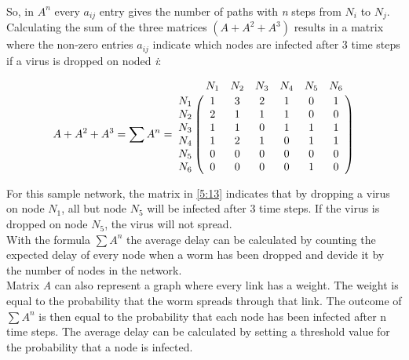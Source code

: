 ~~\\
So, in $A^{n}$ every $a_{ij}$ entry gives the number of paths with \textit{n} steps from $N_{i}$ to $N_{j}$.\\

Calculating the sum of the three matrices $(A + A^{2} + A^{3}) $ results in a matrix where the non-zero entries $a_{ij}$ indicate which nodes are infected after 3 time steps if a virus is dropped on noded \textit{i}:

\begin{equation}
 A + A^{2} + A^{3} = \sum A^{n} =
\bordermatrix{
         & N_1		& N_2	& N_3	& N_4 	& N_5	&N_6     \cr
    N_1   & 1		& 3		& 2		& 1		& 0		& 1	     \cr
    N_2   & 2		& 1		& 1		& 1		& 0		& 0	     \cr
    N_3   & 1		& 1		& 0		& 1		& 1		& 1	     \cr
    N_4   & 1		& 2		& 1		& 0		& 1		& 1	     \cr
	N_5   & 0		& 0		& 0		& 0		& 0		& 0	     \cr
	N_6   & 0		& 0		& 0		& 0		& 1		& 0	     \cr
}
\end{equation}

For this sample network, the matrix in \ref{5:13} indicates that by dropping a virus on node $N_{1}$, all but node $N_{5}$ will be infected after 3 time steps. If the virus is dropped on node $N_{5}$, the virus will not spread. \\

With the formula $\sum A^{n}$ the average delay can be calculated by counting the expected delay of every node when a worm has been dropped and devide it by the number of nodes in the network. \\

Matrix \textit{A} can also represent a graph where every link has a weight. The weight is equal to the probability that the worm spreads through that link. The outcome of $ \sum A^{n}$ is then equal to the probability that each node has been infected after n time steps. The average delay can be calculated by setting a threshold value for the probability that a node is infected. \\

